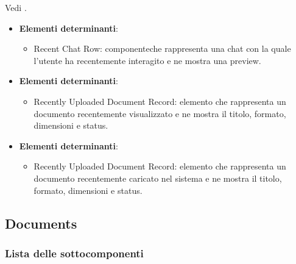 \documentclass[10pt, a4paper]{article}
\begin{document}
Vedi .


\label{RecentChatsListDettaglio}
\begin{itemize}
    \item \textbf{Elementi determinanti}:
    \begin{itemize}
        \item Recent Chat Row: componenteche rappresenta una chat con la quale l'utente ha recentemente interagito e ne mostra una preview.
    \end{itemize}
\end{itemize}


\label{RecentlyViewedTabDettaglio}
\begin{itemize}
    \item \textbf{Elementi determinanti}:
    \begin{itemize}
        \item Recently Uploaded Document Record: elemento che rappresenta un documento recentemente visualizzato e ne mostra il titolo, formato, dimensioni e status.
    \end{itemize}
\end{itemize}

\label{RecentlyUploadedTabDettaglio}
\begin{itemize}
    \item \textbf{Elementi determinanti}:
    \begin{itemize}
        \item Recently Uploaded Document Record: elemento che rappresenta un documento recentemente caricato nel sistema e ne mostra il titolo, formato, dimensioni e status.
    \end{itemize}
\end{itemize}





\subsection{Documents}

\subsubsection{Lista delle sottocomponenti}
\end{document}
